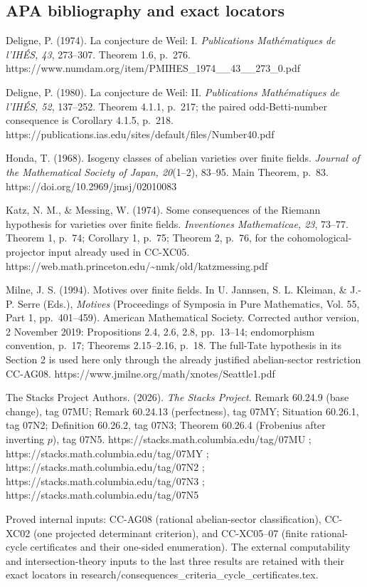 \subsection{APA bibliography and exact
locators}\label{apa-bibliography-and-exact-locators}

Deligne, P. (1974). La conjecture de Weil: I. \emph{Publications
Mathématiques de l'IHÉS, 43}, 273--307. Theorem 1.6, p.~276.
https://www.numdam.org/item/PMIHES\_1974\_\_43\_\_273\_0.pdf

Deligne, P. (1980). La conjecture de Weil: II. \emph{Publications
Mathématiques de l'IHÉS, 52}, 137--252. Theorem 4.1.1, p.~217; the
paired odd-Betti-number consequence is Corollary 4.1.5, p.~218.
https://publications.ias.edu/sites/default/files/Number40.pdf

Honda, T. (1968). Isogeny classes of abelian varieties over finite
fields. \emph{Journal of the Mathematical Society of Japan, 20}(1--2),
83--95. Main Theorem, p.~83. https://doi.org/10.2969/jmsj/02010083

Katz, N. M., \& Messing, W. (1974). Some consequences of the Riemann
hypothesis for varieties over finite fields. \emph{Inventiones
Mathematicae, 23}, 73--77. Theorem 1, p.~74; Corollary 1, p.~75; Theorem
2, p.~76, for the cohomological-projector input already used in CC-XC05.
https://web.math.princeton.edu/\textasciitilde nmk/old/katzmessing.pdf

Milne, J. S. (1994). Motives over finite fields. In U. Jannsen, S. L.
Kleiman, \& J.-P. Serre (Eds.), \emph{Motives} (Proceedings of Symposia
in Pure Mathematics, Vol. 55, Part 1, pp.~401--459). American
Mathematical Society. Corrected author version, 2 November 2019:
Propositions 2.4, 2.6, 2.8, pp.~13--14; endomorphism convention, p.~17;
Theorems 2.15--2.16, p.~18. The full-Tate hypothesis in its Section 2 is
used here only through the already justified abelian-sector restriction
CC-AG08. https://www.jmilne.org/math/xnotes/Seattle1.pdf

The Stacks Project Authors. (2026). \emph{The Stacks Project}. Remark
60.24.9 (base change), tag 07MU; Remark 60.24.13 (perfectness), tag
07MY; Situation 60.26.1, tag 07N2; Definition 60.26.2, tag 07N3; Theorem
60.26.4 (Frobenius after inverting \(p\)), tag 07N5.
https://stacks.math.columbia.edu/tag/07MU ;
https://stacks.math.columbia.edu/tag/07MY ;
https://stacks.math.columbia.edu/tag/07N2 ;
https://stacks.math.columbia.edu/tag/07N3 ;
https://stacks.math.columbia.edu/tag/07N5

Proved internal inputs: CC-AG08 (rational abelian-sector
classification), CC-XC02 (one projected determinant criterion), and
CC-XC05--07 (finite rational-cycle certificates and their one-sided
enumeration). The external computability and intersection-theory inputs
to the last three results are retained with their exact locators in
research/consequences\_criteria\_cycle\_certificates.tex.
